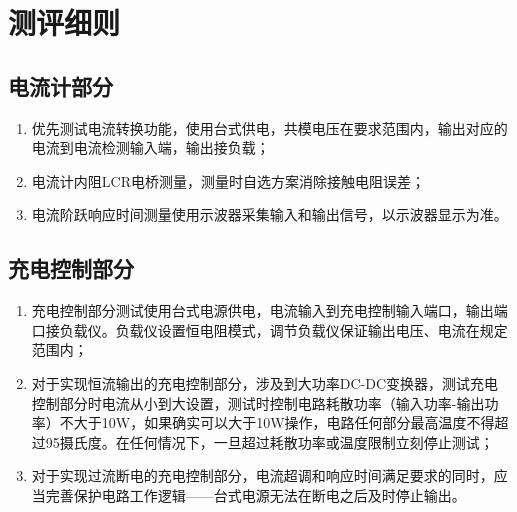 
\section{测评细则}
\subsection{电流计部分}
\begin{enumerate}
    \item 优先测试电流转换功能，使用台式供电，共模电压在要求范围内，输出对应的电流到电流检测输入端，输出接负载；
    \item 电流计内阻LCR电桥测量，测量时自选方案消除接触电阻误差；
    \item 电流阶跃响应时间测量使用示波器采集输入和输出信号，以示波器显示为准。
\end{enumerate}

\subsection{充电控制部分}
\begin{enumerate}
    \item 充电控制部分测试使用台式电源供电，电流输入到充电控制输入端口，输出端口接负载仪。负载仪设置恒电阻模式，调节负载仪保证输出电压、电流在规定范围内；
    \item 对于实现恒流输出的充电控制部分，涉及到大功率DC-DC变换器，测试充电控制部分时电流从小到大设置，测试时控制电路耗散功率（输入功率-输出功率）不大于10W，如果确实可以大于10W操作，电路任何部分最高温度不得超过95摄氏度。在任何情况下，一旦超过耗散功率或温度限制立刻停止测试；
    \item 对于实现过流断电的充电控制部分，电流超调和响应时间满足要求的同时，应当完善保护电路工作逻辑——台式电源无法在断电之后及时停止输出。
\end{enumerate}

